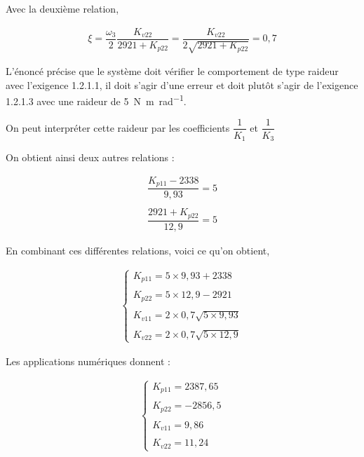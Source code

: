 \documentclass[11pt]{article}
\begin{document}
\begin{UPSTIcorrige}
Avec la deuxième relation,

\begin{align*}
\xi=\dfrac{\omega_3}{2}\dfrac{K_{v22}}{2921+K_{p22}}=\dfrac{K_{v22}}{2\sqrt{2921+K_{p22}}}=0,7
\end{align*}

L'énoncé précise que le système doit vérifier le comportement de type raideur avec l'exigence 1.2.1.1, il doit s'agir d'une erreur et doit plutôt s'agir de l'exigence 1.2.1.3 avec une raideur de \SI{5}{N.m.rad^{-1}}.

On peut interpréter cette raideur par les coefficients $\dfrac{1}{K_1}$ et $\dfrac{1}{K_3}$

On obtient ainsi deux autres relations : 

\begin{align*}
\dfrac{K_{p11}-2338}{9,93}=5\\
\\
\dfrac{2921+K_{p22}}{12,9}=5
\end{align*}

En combinant ces différentes relations, voici ce qu'on obtient,

\begin{align*}
\left\{
\begin{array}{l}
K_{p11}=5\times 9,93+2338\\
\\
K_{p22}=5\times 12,9-2921\\
\\
K_{v11}=2\times 0,7\sqrt{5\times 9,93}\\
\\
K_{v22}=2\times 0,7\sqrt{5\times 12,9}
\end{array}
\right.
\end{align*}

Les applications numériques donnent : 


\begin{align*}
\left\{
\begin{array}{l}
K_{p11}=2387,65 \\
\\
K_{p22}=-2856,5 \\
\\
K_{v11}=9,86\\
\\
K_{v22}=11,24
\end{array}
\right.
\end{align*}


\end{UPSTIcorrige}
\end{document}
